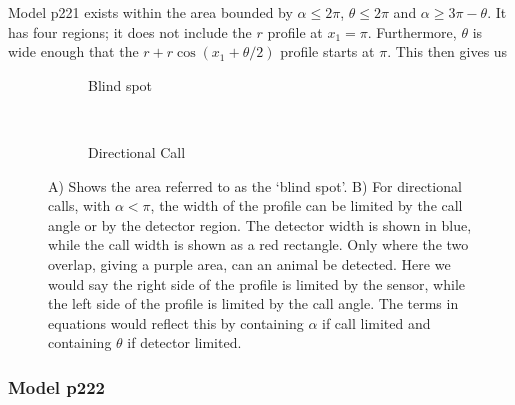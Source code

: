 Model p221 exists within the area bounded by $\alpha\le2\pi$, $\theta\le2\pi$ and $\alpha \ge 3\pi - \theta$. It has four regions; it does not include the $r$ profile at $x_1=\pi$. Furthermore, $\theta$ is wide enough that the $r + r\cos(x_1 + \theta/2)$ profile starts at $\pi$. This then gives us





\begin{figure}[t]
        \centering
        \begin{subfigure}[t]{0.3\textwidth}
                \centering
                \caption{Blind spot}
                \label{f:blindSpot}
        \end{subfigure}
~ 
        \begin{subfigure}[t]{0.3\textwidth}
                \centering
                \caption{Directional Call}
                \label{f:callExplained}
        \end{subfigure}
\caption{A) Shows the area referred to as the `blind spot'. B) For directional calls, with $\alpha<\pi$, the width of the profile can be limited by the call angle or by the detector region.  The detector width is shown in blue, while the call width is shown as a red rectangle. Only where the two overlap, giving a purple area, can an animal be detected. Here we would say the right side of the profile is limited by the sensor, while the left side of the profile is limited by the call angle. The terms in equations would reflect this by containing $\alpha$ if call limited and containing $\theta$ if detector limited.  }
\label{f:p22}
\end{figure}




\subsubsection{Model p222} \label{p222}

